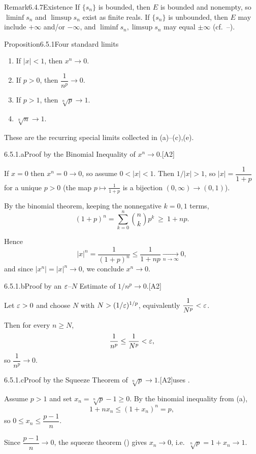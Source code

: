 \documentclass[main.tex]{subfiles}
\begin{document}
\begin{ObjL}{Remark}{6.4.7}{Existence}
If $\{s_n\}$ is bounded, then $E$ is bounded and nonempty, so $\liminf s_n$ and $\limsup s_n$
exist as finite reals. If $\{s_n\}$ is unbounded, then $E$ may include $+\infty$ and/or
$-\infty$, and $\liminf s_n,\limsup s_n$ may equal $\pm\infty$ (cf.\ --).
\end{ObjL}


\begin{Obj}{Proposition}{6.5.1}{Four standard limits}
\begin{enumerate}[label=\textup{(\alph*)},leftmargin=2em,topsep=2pt,itemsep=2pt]
  \item If $|x|<1$, then $x^n\to0$.
  \item If $p>0$, then $\dfrac{1}{n^p}\to0$.
  \item If $p>1$, then $\sqrt[n]{p}\to1$.
  \item $\sqrt[n]{n}\to1$.
\end{enumerate}
These are the recurring special limits collected in (a)--(c),(e).
\end{Obj}
\begin{Prf}{6.5.1.a}{Proof by the Binomial Inequality of $x^n\to0$.}{[A2]}
\item If $x=0$ then $x^n=0\to0$, so assume $0<|x|<1$. Then $1/|x|>1$, so $|x|=\dfrac{1}{1+p}$ for a unique $p>0$ (the map $p\mapsto\frac{1}{1+p}$ is a bijection $(0,\infty)\to(0,1)$).
\item By the binomial theorem, keeping the nonnegative $k=0,1$ terms,
  \[ (1+p)^n=\sum_{k=0}^n\binom{n}{k}p^k\ \ge\ 1+np . \]
\item Hence
  \[ |x|^n=\frac{1}{(1+p)^n}\le\frac{1}{1+np}\xrightarrow[n\to\infty]{}0 , \]
  and since $|x^n|=|x|^n\to0$, we conclude $x^n\to0$.
\end{Prf}
\begin{Prf}{6.5.1.b}{Proof by an $\varepsilon$--$N$ Estimate of $1/n^p\to0$.}{[A2]}
\item Let $\varepsilon>0$ and choose $N$ with $N>(1/\varepsilon)^{1/p}$, equivalently $\dfrac{1}{N^p}<\varepsilon$.
\item Then for every $n\ge N$,
  \[ \frac{1}{n^p}\le\frac{1}{N^p}<\varepsilon , \]
  so $\dfrac{1}{n^p}\to0$.
\end{Prf}
\begin{Prf}{6.5.1.c}{Proof by the Squeeze Theorem of $\sqrt[n]{p}\to1$.}{[A2]\quad uses .}
\item Assume $p>1$ and set $x_n=\sqrt[n]{p}-1\ge0$. By the binomial inequality from (a),
  \[ 1+n x_n\le(1+x_n)^n=p , \]
  so $0\le x_n\le\dfrac{p-1}{n}$.
\item Since $\dfrac{p-1}{n}\to0$, the squeeze theorem () gives $x_n\to0$, i.e.\ $\sqrt[n]{p}=1+x_n\to1$.
\end{Prf}
\end{document}
